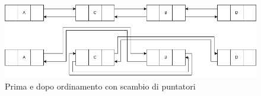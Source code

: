 \begin{figure}[h]
    \centering
    \includegraphics[scale=0.4]{diagrams/swap.png}
    \caption{Prima e dopo ordinamento con scambio di puntatori}
    \label{fig:swap}
\end{figure}


